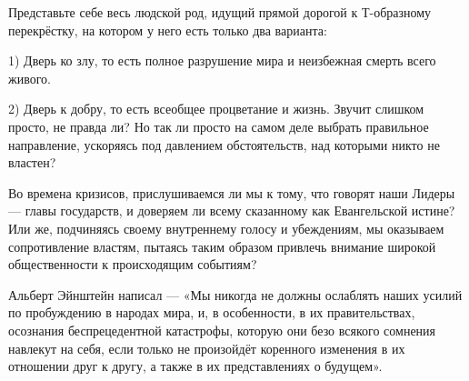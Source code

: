 \documentclass[a4paper,12pt]{book}
\begin{document}
\par
Представьте себе весь людской род, идущий прямой дорогой к Т-образному перекрёстку, на котором у него есть только два варианта:
\par
1) Дверь ко злу, то есть полное разрушение мира и неизбежная смерть всего живого.
\par
2) Дверь к добру, то есть всеобщее процветание и жизнь.
Звучит слишком просто, не правда ли? Но так ли просто на самом деле выбрать правильное направление, ускоряясь под давлением обстоятельств, над которыми никто не властен?\\
\par
Во времена кризисов, прислушиваемся ли мы к тому, что говорят наши Лидеры — главы государств, и доверяем ли всему сказанному как Евангельской истине? Или же, подчиняясь своему внутреннему голосу и убеждениям, мы оказываем сопротивление властям, пытаясь таким образом привлечь внимание широкой общественности к происходящим событиям?\\
\par
Альберт Эйнштейн написал — «Мы никогда не должны ослаблять наших усилий по пробуждению в народах мира, и, в особенности, в их правительствах, осознания беспрецедентной катастрофы, которую они безо всякого сомнения навлекут на себя, если только не произойдёт коренного изменения в их отношении друг к другу, а также в их представлениях о будущем».
\end{document}
